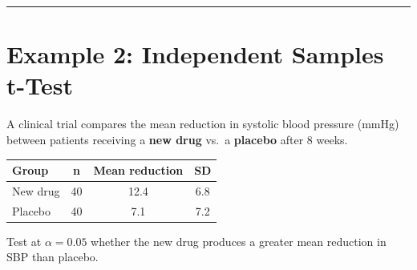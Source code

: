 \documentclass[
  12pt,
  letterpaper,
]{book}
\newcounter{none} %
\begin{document}
\begin{center}\rule{0.5\linewidth}{0.5pt}\end{center}

\section{Example 2: Independent Samples
t-Test}\label{example-2-independent-samples-t-test}

A clinical trial compares the mean reduction in systolic blood pressure
(mmHg) between patients receiving a \textbf{new drug} vs.~a
\textbf{placebo} after 8 weeks.

{\def\LTcaptype{none} %
\begin{longtable}[]{@{}lccc@{}}
\toprule\noalign{}
Group & n & Mean reduction & SD \\
\midrule\noalign{}
\endhead
\bottomrule\noalign{}
\endlastfoot
New drug & 40 & 12.4 & 6.8 \\
Placebo & 40 & 7.1 & 7.2 \\
\end{longtable}
}

Test at \(\alpha = 0.05\) whether the new drug produces a greater mean
reduction in SBP than placebo.
\end{document}
